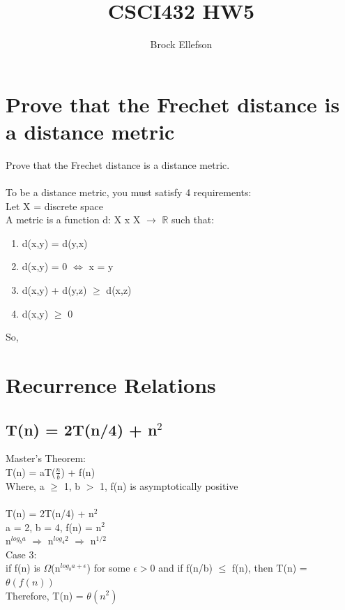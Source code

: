 \documentclass[10pt,letterpaper]{article}
\author{Brock Ellefson}
\title{CSCI432 HW5}
\newcommand{\R}{\mathbb{R}}
\begin{document}
\maketitle

\section{Prove that the Frechet distance is a distance metric}

Prove that the Frechet distance is a distance metric.\\
\\
To be a distance metric, you must satisfy 4 requirements:\\
Let X = discrete space\\
A metric is a function d: X x X $\rightarrow$ $\R$ such that:
\begin{enumerate}
  \item d(x,y) = d(y,x)
  \item d(x,y) = 0 $\Leftrightarrow$ x = y
  \item d(x,y) + d(y,z) $\geq$ d(x,z)
  \item d(x,y) $\geq$ 0
\end{enumerate}
So,\\


\section{Recurrence Relations}
\subsection{T(n) = 2T(n/4) + n$^{2}$}
Master's Theorem:\\
T(n) = aT($\frac{n}{b}$) + f(n)\\
Where, a $\geq$ 1, b $>$ 1, f(n) is asymptotically positive\\
\\
T(n) = 2T(n/4) + n$^{2}$\\
a = 2, b = 4, f(n) = n$^{2}$\\
n$^{log_{b}a}$ $\Rightarrow$ n$^{log_{4}2}$ $\Rightarrow$ n$^{1/2}$\\
Case 3:\\
if f(n) is $\Omega$(n$^{log_{b}a + \epsilon}$) for some $\epsilon > 0$ and if f(n/b) $\leq$ f(n), then T(n) = $\theta(f(n))$\\
Therefore, T(n) = $\theta(n^{2})$
\end{document}
